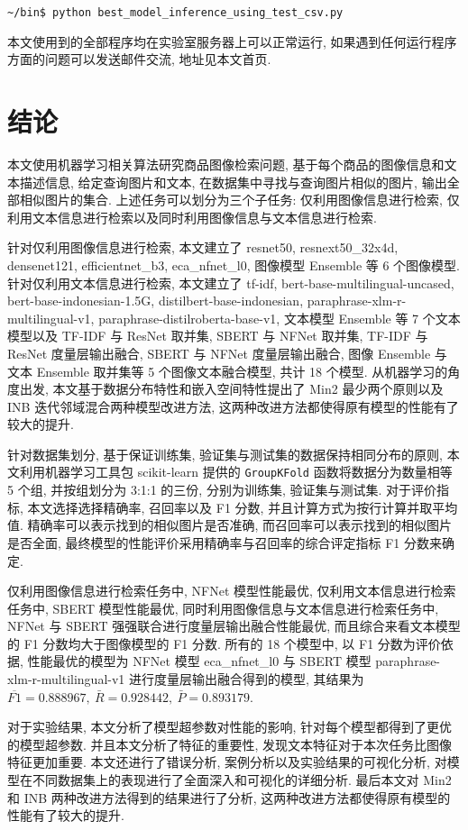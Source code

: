 \documentclass[12pt]{article}
\begin{document}
\verb|~/bin$ python best_model_inference_using_test_csv.py|

本文使用到的全部程序均在实验室服务器上可以正常运行, 如果遇到任何运行程序方面的问题可以发送邮件交流, 地址见本文首页.

\section{结论}

本文使用机器学习相关算法研究商品图像检索问题, 基于每个商品的图像信息和文本描述信息, 给定查询图片和文本, 在数据集中寻找与查询图片相似的图片, 输出全部相似图片的集合. 上述任务可以划分为三个子任务: 仅利用图像信息进行检索, 仅利用文本信息进行检索以及同时利用图像信息与文本信息进行检索. 

针对仅利用图像信息进行检索, 本文建立了 resnet50, resnext50\_32x4d, densenet121, efficientnet\_b3, eca\_nfnet\_l0, 图像模型 Ensemble 等 6 个图像模型. 针对仅利用文本信息进行检索, 本文建立了 tf-idf, bert-base-multilingual-uncased, bert-base-indonesian-1.5G, distilbert-base-indonesian, paraphrase-xlm-r-multilingual-v1, paraphrase-distilroberta-base-v1, 文本模型 Ensemble 等 7 个文本模型以及 TF-IDF 与 ResNet 取并集, SBERT 与 NFNet 取并集, TF-IDF 与 ResNet 度量层输出融合, SBERT 与 NFNet 度量层输出融合, 图像 Ensemble 与 文本 Ensemble 取并集等 5 个图像文本融合模型, 共计 18 个模型. 从机器学习的角度出发, 本文基于数据分布特性和嵌入空间特性提出了 Min2 最少两个原则以及 INB 迭代邻域混合两种模型改进方法, 这两种改进方法都使得原有模型的性能有了较大的提升.

针对数据集划分, 基于保证训练集, 验证集与测试集的数据保持相同分布的原则, 本文利用机器学习工具包 scikit-learn 提供的 \verb|GroupKFold| 函数将数据分为数量相等 5 个组, 并按组划分为 3:1:1 的三份, 分别为训练集, 验证集与测试集. 对于评价指标, 本文选择选择精确率, 召回率以及 F1 分数, 并且计算方式为按行计算并取平均值. 精确率可以表示找到的相似图片是否准确, 而召回率可以表示找到的相似图片是否全面, 最终模型的性能评价采用精确率与召回率的综合评定指标 F1 分数来确定.

仅利用图像信息进行检索任务中, NFNet 模型性能最优, 仅利用文本信息进行检索任务中, SBERT 模型性能最优, 同时利用图像信息与文本信息进行检索任务中, NFNet 与 SBERT 强强联合进行度量层输出融合性能最优, 而且综合来看文本模型的 F1 分数均大于图像模型的 F1 分数. 所有的 18 个模型中, 以 F1 分数为评价依据, 性能最优的模型为 NFNet 模型 eca\_nfnet\_l0 与 SBERT 模型 paraphrase-xlm-r-multilingual-v1 进行度量层输出融合得到的模型, 其结果为 $\overline{F1}=0.888967,~\bar{R}=0.928442,~\bar{P}=0.893179$. 

对于实验结果, 本文分析了模型超参数对性能的影响, 针对每个模型都得到了更优的模型超参数. 并且本文分析了特征的重要性, 发现文本特征对于本次任务比图像特征更加重要. 本文还进行了错误分析, 案例分析以及实验结果的可视化分析, 对模型在不同数据集上的表现进行了全面深入和可视化的详细分析. 最后本文对 Min2 和 INB 两种改进方法得到的结果进行了分析, 这两种改进方法都使得原有模型的性能有了较大的提升.



\end{document}
